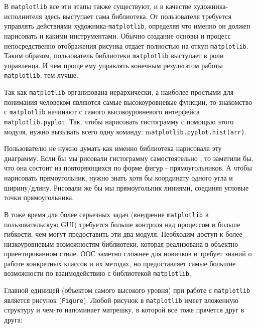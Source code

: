 В \lstinline!matplotlib! все эти этапы также существуют, и в качестве художника-исполнителя здесь выступает сама библиотека. От пользователя требуется управлять действиями художника-\lstinline!matplotlib!, определяя что именно он должен нарисовать и какими инструментами. Обычно создание основы и процесс непосредственно отображения рисунка отдает полностью на откуп \lstinline!matplotlib!. Таким образом, пользователь библиотеки \lstinline!matplotlib! выступает в роли управленца. И чем проще ему управлять конечным результатом работы \lstinline!matplotlib!, тем лучше.

Так как \lstinline!matplotlib! организована иерархически, а наиболее простыми для понимания человеком являются самые высокоуровневые функции, то знакомство с \lstinline!matplotlib! начинают с самого высокоуровневого интерфейса \lstinline!matplotlib.pyplot!. Так, чтобы нарисовать гистограмму с помощью этого модуля, нужно вызывать всего одну команду: m\lstinline!atplotlib.pyplot.hist(arr)!.

Пользователю не нужно думать как именно библиотека нарисовала эту диаграмму. Если бы мы рисовали гистограмму самостоятельно , то заметили бы, что она состоит из повторяющихся по форме фигур - прямоугольников. А чтобы нарисовать прямоугольник, нужно знать хотя бы координату одного угла и ширину/длину. Рисовали же бы мы прямоугольник линиями, соединяя угловые точки прямоугольника.

В тоже время для более серьезных задач (внедрение \lstinline!matplotlib! в пользовательскую GUI) требуется больше контроля над процессом и больше гибкости, чем могут предоставить эти два модуля. Необходим доступ к более низкоуровневым возможностям библиотеки, которая реализована в объектно-ориентированном стиле. ООС заметно сложнее для новичков и требует знаний о работе конкретных классов и их методах, но предоставляет самые большие возможности по взаимодействию с библиотекой \lstinline!matplotlib!.

Главной единицей (объектом самого высокого уровня) при работе с \lstinline!matplotlib! является рисунок (\lstinline!Figure!). Любой рисунок в \lstinline!matplotlib! имеет вложенную структуру и чем-то напоминает матрешку, в которой все тоже прячется друг в друга:


